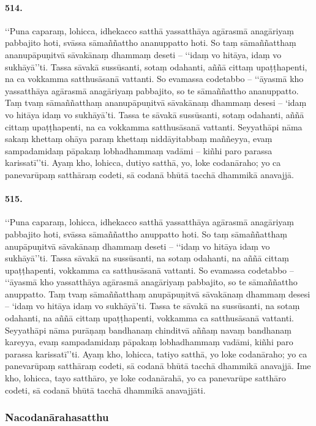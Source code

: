 \paragraph{514.} ‘‘Puna caparaṃ, lohicca, idhekacco satthā yassatthāya agārasmā anagāriyaṃ pabbajito hoti, svāssa sāmaññattho ananuppatto hoti. So taṃ sāmaññatthaṃ ananupāpuṇitvā sāvakānaṃ dhammaṃ deseti – ‘‘idaṃ vo hitāya, idaṃ vo sukhāyā’’ti. Tassa sāvakā sussūsanti, sotaṃ odahanti, aññā cittaṃ upaṭṭhapenti, na ca vokkamma satthusāsanā vattanti. So evamassa codetabbo – ‘‘āyasmā kho yassatthāya agārasmā anagāriyaṃ pabbajito, so te sāmaññattho ananuppatto. Taṃ tvaṃ sāmaññatthaṃ ananupāpuṇitvā sāvakānaṃ dhammaṃ desesi – ‘idaṃ vo hitāya idaṃ vo sukhāyā’ti. Tassa te sāvakā sussūsanti, sotaṃ odahanti, aññā cittaṃ upaṭṭhapenti, na ca vokkamma satthusāsanā vattanti. Seyyathāpi nāma sakaṃ khettaṃ ohāya paraṃ khettaṃ niddāyitabbaṃ maññeyya, evaṃ sampadamidaṃ pāpakaṃ lobhadhammaṃ vadāmi – kiñhi paro parassa karissatī’’ti. Ayaṃ kho, lohicca, dutiyo satthā, yo, loke codanāraho; yo ca panevarūpaṃ satthāraṃ codeti, sā codanā bhūtā tacchā dhammikā anavajjā.

\paragraph{515.} ‘‘Puna caparaṃ, lohicca, idhekacco satthā yassatthāya agārasmā anagāriyaṃ pabbajito hoti, svāssa sāmaññattho anuppatto hoti. So taṃ sāmaññatthaṃ anupāpuṇitvā sāvakānaṃ dhammaṃ deseti – ‘‘idaṃ vo hitāya idaṃ vo sukhāyā’’ti. Tassa sāvakā na sussūsanti, na sotaṃ odahanti, na aññā cittaṃ upaṭṭhapenti, vokkamma ca satthusāsanā vattanti. So evamassa codetabbo – ‘‘āyasmā kho yassatthāya agārasmā anagāriyaṃ pabbajito, so te sāmaññattho anuppatto. Taṃ tvaṃ sāmaññatthaṃ anupāpuṇitvā sāvakānaṃ dhammaṃ desesi – ‘idaṃ vo hitāya idaṃ vo sukhāyā’ti. Tassa te sāvakā na sussūsanti, na sotaṃ odahanti, na aññā cittaṃ upaṭṭhapenti, vokkamma ca satthusāsanā vattanti. Seyyathāpi nāma purāṇaṃ bandhanaṃ chinditvā aññaṃ navaṃ bandhanaṃ kareyya, evaṃ sampadamidaṃ pāpakaṃ lobhadhammaṃ vadāmi, kiñhi paro parassa karissatī’’ti. Ayaṃ kho, lohicca, tatiyo satthā, yo loke codanāraho; yo ca panevarūpaṃ satthāraṃ codeti, sā codanā bhūtā tacchā dhammikā anavajjā. Ime kho, lohicca, tayo satthāro, ye loke codanārahā, yo ca panevarūpe satthāro codeti, sā codanā bhūtā tacchā dhammikā anavajjāti.

\subsubsection{Nacodanārahasatthu}

